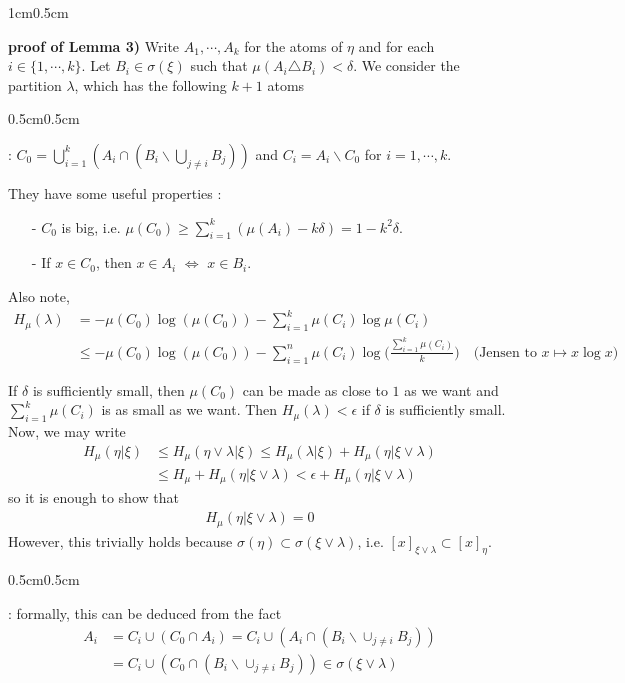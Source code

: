 \documentclass[12pt,a4paper]{report}
\newenvironment{proof}
{\begin{changemargin}{1cm}{0.5cm} 
	}%
	{\end{changemargin}
}
\newenvironment{subproof}
{\begin{changemargin}{0.5cm}{0.5cm}
	}%
	{\end{changemargin}
}
\begin{document}
\begin{proof}
\textbf{proof of Lemma 3)} Write $A_1, \cdots, A_k$ for the atoms of $\eta$ and for each $i \in \{1,\cdots, k\}$. Let $B_i \in \sigma(\xi)$ such that $\mu(A_i \triangle B_i) < \delta$. We consider the partition $\lambda$, which has the following $k+1$ atoms
\begin{subproof}
: $C_0 = \bigcup_{i=1}^k (A_i \cap (B_i \backslash \bigcup_{j\neq i} B_j ) )$ and $C_i = A_i \backslash C_0$ for $i=1, \cdots, k$.

They have some useful properties :
\begin{itemize}
\item[-] $C_{0}$ is big, i.e. $\mu(C_0) \geq \sum_{i=1}^k (\mu(A_i) - k\delta) = 1-k^2 \delta$.
\item[-] If $x\in C_0$, then $x\in A_i$ $\Leftrightarrow$ $x\in B_i$.
\end{itemize}
Also note, 
\begin{align*}
H_{\mu} (\lambda) &= -\mu(C_0) \log (\mu(C_0)) - \sum_{i=1}^k \mu(C_i) \log \mu (C_i) \\
&\leq -\mu(C_0) \log (\mu (C_0)) - \sum_{i=1}^n \mu(C_i) \log \Big( \frac{\sum_{i=1}^k \mu(C_i)}{k} \Big) \quad \text{(Jensen to }x\mapsto x\log x) 
\end{align*}
\end{subproof}
If $\delta$ is sufficiently small, then $\mu(C_0)$ can be made as close to $1$ as we want and $\sum_{i=1}^k \mu(C_i)$ is as small as we want. Then
$H_{\mu}(\lambda) < \epsilon$ if $\delta$ is sufficiently small. Now, we may write
\begin{align*}
H_{\mu}(\eta | \xi) &\leq H_{\mu}(\eta \vee \lambda | \xi) \leq H_{\mu}(\lambda | \xi) + H_{\mu}(\eta | \xi \vee \lambda) \\
& \leq H_{\mu} + H_{\mu}(\eta | \xi \vee \lambda) < \epsilon + H_{\mu}(\eta | \xi \vee \lambda)
\end{align*}
so it is enough to show that
\begin{align*}
H_{\mu}(\eta | \xi \vee \lambda) =0
\end{align*}
However, this trivially holds because $\sigma (\eta) \subset \sigma(\xi \vee \lambda)$, i.e. $[x]_{\xi \vee \lambda} \subset [x]_{\eta}$.
\begin{subproof}
: formally, this can be deduced from the fact \begin{align*}
A_i &= C_i \cup (C_0 \cap A_i) = C_i \cup (A_i \cap (B_i \backslash \cup_{j\neq i} B_j)) \\
&= C_i \cup (C_0 \cap (B_i \backslash \cup_{j\neq i} B_j)) \in \sigma(\xi \vee \lambda)
\end{align*}
\end{subproof}

\eop
\end{proof}
\s
\end{document}
